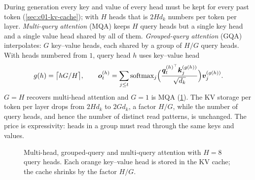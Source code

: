 During generation every key and value of every head must be kept for every past token
(\cref{sec:c01-kv-cache}); with $H$ heads that is $2Hd_k$ numbers per token per layer.
\emph{Multi-query attention} (MQA) \citep{c01-shazeer2019mqa} keeps $H$ query heads but a
single key head and a single value head shared by all of them. \emph{Grouped-query
attention} (GQA) \citep{c01-ainslie2023gqa} interpolates: $G$ key--value heads, each shared
by a group of $H/G$ query heads. With heads numbered from $1$, query head $h$ uses key--value
head
\begin{equation}\label{eq:c01-gqa-map}
  g(h) = \bigl\lceil h G / H \bigr\rceil,\qquad
  \bm{o}_t^{(h)} = \sum_{j \le t}\operatorname{softmax}_j\Bigl(\frac{\bm{q}_t^{(h)^{\top}}\bm{k}_j^{(g(h))}}{\sqrt{d_k}}\Bigr)\bm{v}_j^{(g(h))}.
\end{equation}
$G = H$ recovers multi-head attention and $G = 1$ is MQA (\cref{fig:c01-gqa}). The KV storage
per token per layer drops from $2Hd_k$ to $2Gd_k$, a factor $H/G$, while the number of
query heads, and hence the number of distinct read patterns, is unchanged. The price is
expressivity: heads in a group must read through the same keys and values.

\begin{figure}[t]
\centering
{}
\caption{Multi-head, grouped-query and multi-query attention with $H = 8$ query heads. Each
orange key--value head is stored in the KV cache; the cache shrinks by the factor $H/G$.}
\label{fig:c01-gqa}
\end{figure}

